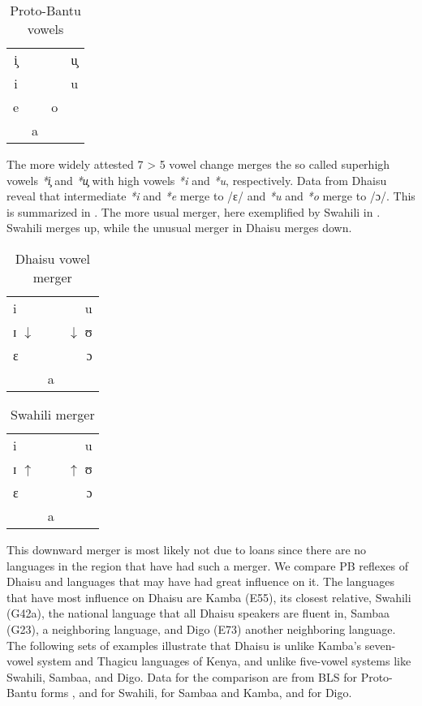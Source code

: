 \documentclass[output=paper,colorlinks,citecolor=brown]{langscibook}
\begin{document}
\begin{table}
	\caption{Proto-Bantu vowels \citep[82]{Meeussen1967}}
    \label{tab:ngonyani:3}
        \begin{tabular}{cccc}
        i̧ &    &   & u̧\\
        i &    &   & u\\
        e &    & o &\\
          & a  &   &\\
        \end{tabular}
\end{table}

The more widely attested 7 > 5 vowel change merges the so called superhigh vowels \textit{*i̧} and \textit{*u̧} with high vowels \textit{*i} and \textit{*u}, respectively. Data from Dhaisu reveal that intermediate \textit{*i} and \textit{*e }merge to /ɛ/ and \textit{*u} and \textit{*o} merge to /ɔ/. This is summarized in . The more usual merger, here exemplified by Swahili in . Swahili merges up, while the unusual merger in Dhaisu merges down.

\begin{table}
	\caption{Dhaisu vowel merger}
	\label{tab:ngonyani:4}
    \begin{tabular}{lcr}
        i               &   & u\\
        ɪ $\downarrow$  &   & $\downarrow$ ʊ\\
        ɛ               &   & ɔ\\
                        & a &\\
    \end{tabular}
\end{table}	

\begin{table}
	\caption{Swahili merger}
    \label{tab:ngonyani:5}
    \begin{tabular}{lcr}
        i               &   & u\\
        ɪ $\uparrow$    &   & $\uparrow$  ʊ\\
        ɛ               &   & ɔ\\
                        & a &\\
    \end{tabular}
\end{table}

This downward merger is most likely not due to loans since there are no languages in the region that have had such a merger. 
We compare PB reflexes of Dhaisu and languages that may have had great influence on it. The languages that have most influence on Dhaisu are Kamba (E55), its closest relative, Swahili (G42a), the national language that all Dhaisu speakers are fluent in, Sambaa (G23), a neighboring language, and Digo (E73) another neighboring language. The following sets of examples illustrate that Dhaisu is unlike Kamba's seven-vowel system and Thagicu languages of Kenya, and unlike five-vowel systems like Swahili, Sambaa, and Digo. Data for the comparison are from BLS for Proto-Bantu forms  \citep{BastinEtAl2002}, \cite{NurseHinnebusch1993}  and \cite{TUKI1996} for Swahili, \cite{NursePhilippson1975} for  Sambaa and Kamba, and \cite{MwalonyaEtAl2004} for Digo.
\end{document}
